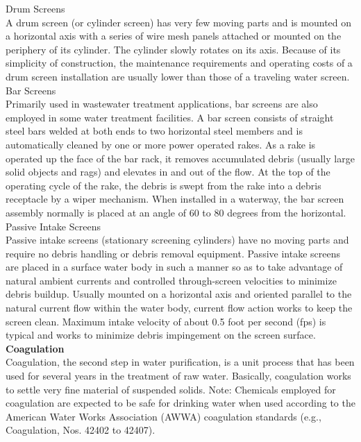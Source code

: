 Drum Screens\\
A drum screen (or cylinder screen) has very few moving parts and is mounted on a horizontal axis with a series of wire mesh panels attached or mounted on the periphery of its cylinder. The cylinder slowly rotates on its axis. Because of its simplicity of construction, the maintenance requirements and operating costs of a drum screen installation are usually lower than those of a traveling water screen.\\
Bar Screens\\
Primarily used in wastewater treatment applications, bar screens are also employed in some water treatment facilities. A bar screen consists of straight steel bars welded at both ends to two horizontal steel members and is automatically cleaned by one
or more power operated rakes. As a rake is operated up the face of the bar rack, it removes accumulated debris (usually large solid objects and rags) and elevates in and out of the flow. At the top of the operating cycle of the rake, the debris is swept from the rake into a debris receptacle by a wiper mechanism. When installed in a waterway, the bar screen assembly normally is placed at an angle of 60 to 80 degrees from the horizontal.\\
Passive Intake Screens\\
Passive intake screens (stationary screening cylinders) have no moving parts and require no debris handling or debris removal equipment. Passive intake screens are placed in a surface water body in such a manner so as to take advantage of natural ambient currents and controlled through-screen velocities to minimize debris buildup. Usually mounted on a horizontal axis and oriented parallel to the natural current flow within the water body, current flow action works to keep the screen clean. Maximum intake velocity of about 0.5 foot per second (fps) is typical and works to minimize debris impingement on the screen surface.\\


\textbf{Coagulation}\\
Coagulation, the second step in water purification, is a unit process that has been used for several years in the treatment of raw water. Basically, coagulation works to settle very fine material of suspended solids.
Note: Chemicals employed for coagulation are expected to be safe for drinking water when used according to the American Water Works Association (AWWA) coagulation standards (e.g., Coagulation, Nos. 42402 to 42407).\\

